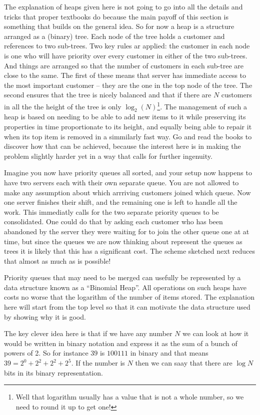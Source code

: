 The explanation of heaps given here is not going to go into all the
details and tricks that proper textbooks do because the main payoff
of this section is something that builds on the general idea. So for
now a heap is a structure arranged as a (binary) tree. Each node
of the tree holds a customer and references to two sub-trees. Two key
rules ar applied: the customer in each node is one who will have priority
over every customer in either of the two sub-trees. And things are
arranged so that the number of customers in each sub-tree are
close to the same.  The first of these means that server has
immediate access to the most important customer -- they are the one
in the top node of the tree. The second ensures that the tree
is nicely balanced and that if there are $N$ customers in all the
the height of the tree is only $\log_{2}(N)$\footnote{Well that logarithm
usually has a value that is not a whole number, so we need to round
it up to get one!}. The management of such a heap is based on
needing to be able to add new items to it while preserving its
properties in time proportionate to its height, and equally
being able to repair it when its top item is removed in a simmilarly
fast way. Go and read the books to discover how that can be achieved,
because the interest here is in making the problem slightly harder
yet in a way that calls for further ingenuity.

Imagine you now have priority queues all sorted, and your setup now
happens to have two servers each with their own separate queue. You
are not allowed to make any assumption about which arrriving customers
joined which queue. Now one server finishes their shift, and the
remaining one is left to handle all the work. This immediatly calls
for the two separate priority queues to be consolidated. One could
do that by asking each customer who has been abandoned by the server
they were waiting for to join the other queue one at at time, but
since the queues we are now thinking about represent the queues as
trees it is likely that this has a significant cost. The scheme
sketched next reduces that almost as much as is possible!

Priority queues that may need to be merged can usefully be represented
by a data structure known as a ``Binomial Heap''. All operations on
such heaps have costs no worse that the logarithm of the number of
items stored. The explanation here will start from the top level
so that it can motivate the data structure used by showing why it is
good.

The key clever idea here is that if we have any number $N$ we can look
at how it would be written in binary notation and express it as the
sum of a bunch of powers of 2. So for instance $39$ is $100111$ in
binary and that means $39 = 2^0 + 2^2 + 2^2 + 2^5$. If the number is $N$
then we can saay that there are $\log N$ bits in its binary representation.

